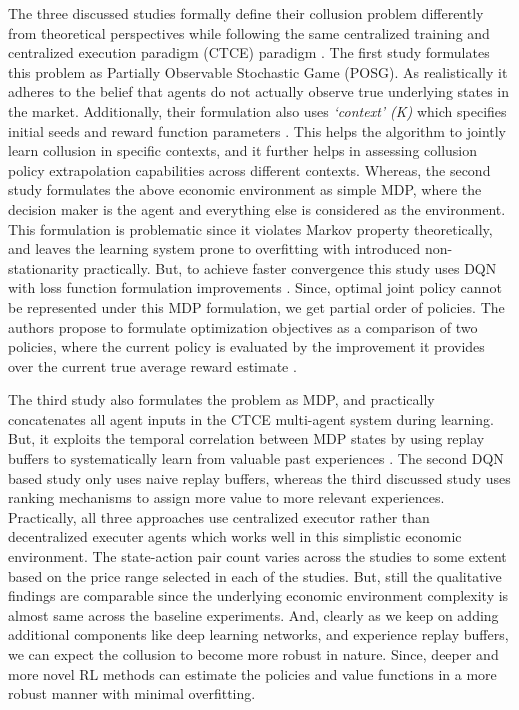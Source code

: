\documentclass{article}
\begin{document}
The three discussed studies formally define their collusion problem differently from theoretical perspectives while following the same centralized training and centralized execution paradigm (CTCE) paradigm \cite{papoudakis2019dealing}.
The first study formulates this problem as Partially Observable Stochastic Game (POSG).
As realistically it adheres to the belief that agents do not actually observe true underlying states in the market.
Additionally, their formulation also uses \textit{`context’ (K)} which specifies initial seeds and reward function parameters \cite{kirk2021survey}.
This helps the algorithm to jointly learn collusion in specific contexts, and it further helps in assessing collusion policy extrapolation capabilities across different contexts.
Whereas, the second study formulates the above economic environment as simple MDP, where the decision maker is the agent and everything else is considered as the environment.
This formulation is problematic since it violates Markov property theoretically, and leaves the learning system prone to overfitting with introduced non-stationarity practically.
But, to achieve faster convergence this study uses DQN with loss function formulation improvements \cite{hester2018deep}.
Since, optimal joint policy cannot be represented under this MDP formulation, we get partial order of policies.
The authors propose to formulate optimization objectives as a comparison of two policies, where the current policy is evaluated by the improvement it provides over the current true average reward estimate \cite{sutton2018reinforcement}.


The third study also formulates the problem as MDP, and practically concatenates all agent inputs in the CTCE multi-agent system during learning.
But, it exploits the temporal correlation between MDP states by using replay buffers to systematically learn from valuable past experiences \cite{zhang2017deeper}.
The second DQN based study only uses naive replay buffers, whereas the third discussed study uses ranking mechanisms to assign more value to more relevant experiences.
Practically, all three approaches use centralized executor rather than decentralized executer agents which works well in this simplistic economic environment.
The state-action pair count varies across the studies to some extent based on the price range selected in each of the studies.
But, still the qualitative findings are comparable since the underlying economic environment complexity is almost same across the baseline experiments.
And, clearly as we keep on adding additional components like deep learning networks, and experience replay buffers, we can expect the collusion to become more robust in nature.
Since, deeper and more novel RL methods can estimate the policies and value functions in a more robust manner with minimal overfitting.
\end{document}
